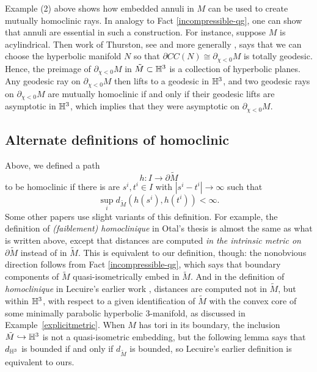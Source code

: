 \documentclass[12pt]{amsart}
\theoremstyle{definition}
\theoremstyle{remark}
\newcommand{\note}[1]{\marginpar{\tiny \raggedright \color{red} #1 }}
\newcommand{\cyr}{\color{red}\small\sf}
\begin{document}
Example (2) above shows how embedded annuli in $M$ can be used to create mutually homoclinic rays. In analogy to Fact \ref{incompressible-qg}, one can show that annuli are essential in such a construction. For instance, suppose $M$ is acylindrical. Then work of Thurston, see \cite{Kapovichhyperbolic} and more generally \cite{Lecuireplissage},  says that we can  choose the hyperbolic manifold $N$ so that $\partial CC(N) \cong \partial_{\chi<0} M$  is totally geodesic. Hence,  the preimage of $\partial_{\chi<0} M$ in $\tilde M \subset \mathbb H^3$ is a collection of hyperbolic planes.  Any geodesic ray on $\partial_{\chi<0} M$ then lifts to a geodesic in $\mathbb H^3$, and two geodesic rays on $\partial_{\chi<0} M $ are mutually homoclinic if and only if their geodesic lifts are asymptotic in $\mathbb H^3$, which implies that they were asymptotic on $\partial_{\chi<0} M $.

\medskip



\subsection{Alternate definitions of homoclinic}
\label{alternate} \note{Added this subsection}
Above, we defined a path $$h : I \longrightarrow \partial \tilde M$$ to be homoclinic if there is are $s^i,t^i \in I$  with $|s^i-t^i|\to \infty$ such that $$\sup_i d_{\tilde M} (h(s^i),h(t^i)) < \infty.$$
Some other papers use slight variants of this definition. For example, the definition of \emph{(faiblement) homoclinique} in Otal's thesis \cite{Otalcourants} is almost the same as what is written above, except that distances are computed \emph{in the intrinsic metric on $\partial \tilde M$} instead of in $\tilde M$. This is equivalent to our definition, though: the nonobvious direction follows from Fact \ref{incompressible-qg}, which says that boundary components of $\tilde M$ quasi-isometrically embed in $\tilde M$. And in the definition of \emph{homoclinique} in Lecuire's earlier work \cite{Lecuireplissage}, distances are computed not in $\tilde M$, but within $\mathbb H^3$, with respect to a given identification of $\tilde M$ with the convex core of some minimally parabolic hyperbolic $3$-manifold, as discussed in Example~\ref{explicitmetric}. When $M$ has tori in its boundary, the inclusion $\tilde M \hookrightarrow \mathbb H^3$ is not a quasi-isometric embedding, but the following lemma says that $d_{\mathbb H^3}$ is bounded if and only if $d_{\tilde M}$ is bounded, so Lecuire's earlier definition is equivalent to ours.
\end{document}
